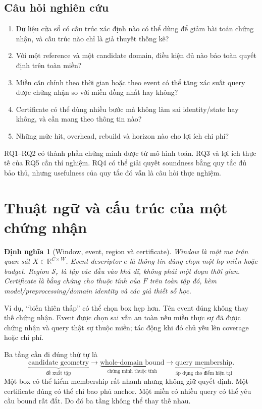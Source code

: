 \documentclass[11pt,a4paper]{article}
\newcommand{\R}{\mathbb R}
\newcommand{\Sset}{\mathcal S}
\newtheorem{definition}{Định nghĩa}[section]
\theoremstyle{remark}
\begin{document}
\subsection{Câu hỏi nghiên cứu}
\begin{enumerate}[label=RQ\arabic*.]
\item Dữ liệu cửa sổ có cấu trúc xác định nào có thể dùng để giảm bài toán
chứng nhận, và cấu trúc nào chỉ là giả thuyết thống kê?
\item Với một reference và một candidate domain, điều kiện đủ nào bảo toàn
quyết định trên toàn miền?
\item Miền căn chỉnh theo thời gian hoặc theo event có thể tăng xác suất
query được chứng nhận so với miền đồng nhất hay không?
\item Certificate có thể dùng nhiều bước mà không làm sai identity/state
hay không, và cần mang theo thông tin nào?
\item Những mức hit, overhead, rebuild và horizon nào cho lợi ích chi phí?
\end{enumerate}
RQ1--RQ2 có thành phần chứng minh được từ mô hình toán. RQ3 và lợi ích thực
tế của RQ5 cần thí nghiệm. RQ4 có thể giải quyết soundness bằng quy tắc đủ
bảo thủ, nhưng usefulness của quy tắc đó vẫn là câu hỏi thực nghiệm.

\section{Thuật ngữ và cấu trúc của một chứng nhận}
\begin{definition}[Window, event, region và certificate]
Window là một ma trận quan sát $X\in\R^{C\times W}$. Event descriptor $e$
là thông tin dùng chọn một họ miền hoặc budget. Region $\Sset_r$ là tập
các đầu vào khả dĩ, không phải một đoạn thời gian. Certificate là bằng
chứng cho thuộc tính của $F$ trên toàn tập đó, kèm model/preprocessing/domain
identity và các giả thiết số học.
\end{definition}
Ví dụ, ``biến thiên thấp'' có thể chọn box hẹp hơn. Tên event đúng không
thay thế chứng nhận. Event được chọn sai vẫn an toàn nếu miền thực sự đã
được chứng nhận và query thật sự thuộc miền; tác động khi đó chủ yếu lên
coverage hoặc chi phí.

Ba tầng cần đi đúng thứ tự là
\begin{equation}
\underbrace{\text{candidate geometry}}_{\text{đề xuất tập}}
\longrightarrow
\underbrace{\text{whole-domain bound}}_{\text{chứng minh thuộc tính}}
\longrightarrow
\underbrace{\text{query membership}}_{\text{áp dụng cho điểm hiện tại}}.
\end{equation}
Một box có thể kiểm membership rất nhanh nhưng không giữ quyết định.
Một certificate đúng có thể chỉ bao phủ anchor. Một miền có nhiều query
có thể yêu cầu bound rất đắt. Do đó ba tầng không thể thay thế nhau.
\end{document}
